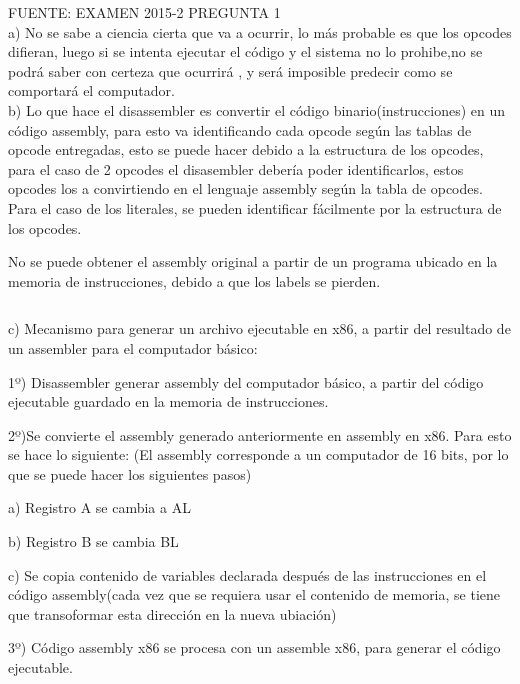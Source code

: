 \documentclass[letter]{article}
\begin{document}
	
	\begin{pregunta}{1} %
	
	FUENTE: EXAMEN 2015-2 PREGUNTA 1
	$$ $$
	a) No se sabe a ciencia cierta que va a ocurrir, lo más probable es que los opcodes difieran, luego si se intenta ejecutar el código y el sistema no lo prohibe,no se podrá saber con certeza que ocurrirá , y será imposible predecir como se comportará el computador. 
		$$ $$
	b) Lo que hace el disassembler es convertir el código binario(instrucciones) en un código assembly, para esto va identificando cada opcode según las tablas de opcode entregadas, esto se puede hacer debido a la estructura de los opcodes, para el caso de 2 opcodes el disasembler debería poder identificarlos, estos opcodes los a convirtiendo en el lenguaje assembly según la tabla de opcodes. Para el caso de los literales, se pueden identificar fácilmente por la estructura de los opcodes.
	
	No se puede obtener el assembly original a partir de un programa ubicado en la memoria de instrucciones, debido a que los labels se pierden.
	
	
	
	$$ $$
	
	
	
	c) Mecanismo para generar un archivo ejecutable en x86, a partir del resultado de un assembler para el computador básico:
	
	1º) Disassembler generar assembly del computador básico, a partir del código ejecutable guardado en la memoria de instrucciones.
	
	2º)Se convierte el assembly generado anteriormente en assembly en x86. Para esto se hace lo siguiente:
	(El assembly corresponde a un computador de 16 bits, por lo que se puede hacer los siguientes pasos)
	
	a) Registro A se cambia a AL
	
	b) Registro B se cambia  BL
	
	c) Se copia contenido de variables declarada después de las instrucciones en el código assembly(cada vez que se requiera usar el contenido de memoria, se tiene que transoformar esta dirección en la nueva ubiación)
	
	3º) Código assembly x86 se procesa con un assemble x86, para generar el código ejecutable.
	
	
	
	
	
	
	
	
	
	
	
	
	\end{pregunta}
	
\end{document}
